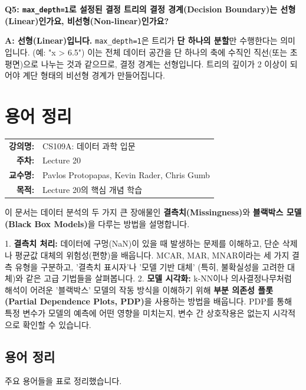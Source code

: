 \documentclass[11pt,a4paper]{book}
\makeatletter
\theoremstyle{definition}
\newcommand{\metainfo}[4]{
\begin{tcolorbox}[
    colback=lightpurple,
    colframe=darkpurple,
    boxrule=1pt,
    arc=2mm,
    left=10pt,
    right=10pt,
    top=8pt,
    bottom=8pt
]
\begin{tabular}{@{}rl@{}}
\textbf{강의명:} & #1 \\[0.3em]
\textbf{주차:} & #2 \\[0.3em]
\textbf{교수명:} & #3 \\[0.3em]
\textbf{목적:} & \begin{minipage}[t]{0.75\textwidth}#4\end{minipage}
\end{tabular}
\end{tcolorbox}
}
\makeatother
\begin{document}
\begin{boxExample}
    \textbf{Q5: \texttt{max\_depth=1}로 설정된 결정 트리의 결정 경계(Decision Boundary)는 선형(Linear)인가요, 비선형(Non-linear)인가요?}
    
    \textbf{A: 선형(Linear)입니다.}
    \texttt{max\_depth=1}은 트리가 \textbf{단 하나의 분할}만 수행한다는 의미입니다. (예: "x > 6.5")
    이는 전체 데이터 공간을 단 하나의 축에 수직인 직선(또는 초평면)으로 나누는 것과 같으므로, 결정 경계는 선형입니다. 트리의 깊이가 2 이상이 되어야 계단 형태의 비선형 경계가 만들어집니다.
\end{boxExample}


\chapter{용어 정리}
\label{ch:lecture20}

\metainfo{CS109A: 데이터 과학 입문}{Lecture 20}{Pavlos Protopapas, Kevin Rader, Chris Gumb}{Lecture 20의 핵심 개념 학습}


\begin{summarybox}
이 문서는 데이터 분석의 두 가지 큰 장애물인 \textbf{결측치(Missingness)}와 \textbf{블랙박스 모델(Black Box Models)}을 다루는 방법을 설명합니다.

1.  \textbf{결측치 처리:} 데이터에 구멍(NaN)이 있을 때 발생하는 문제를 이해하고, 단순 삭제나 평균값 대체의 위험성(편향)을 배웁니다. MCAR, MAR, MNAR이라는 세 가지 결측 유형을 구분하고, '결측치 표시자'나 '모델 기반 대체' (특히, 불확실성을 고려한 대체)와 같은 고급 기법들을 살펴봅니다.
2.  \textbf{모델 시각화:} k-NN이나 의사결정나무처럼 해석이 어려운 '블랙박스' 모델의 작동 방식을 이해하기 위해 \textbf{부분 의존성 플롯(Partial Dependence Plots, PDP)}을 사용하는 방법을 배웁니다. PDP를 통해 특정 변수가 모델의 예측에 어떤 영향을 미치는지, 변수 간 상호작용은 없는지 시각적으로 확인할 수 있습니다.
\end{summarybox}


\section{용어 정리}

주요 용어들을 표로 정리했습니다.
\end{document}
